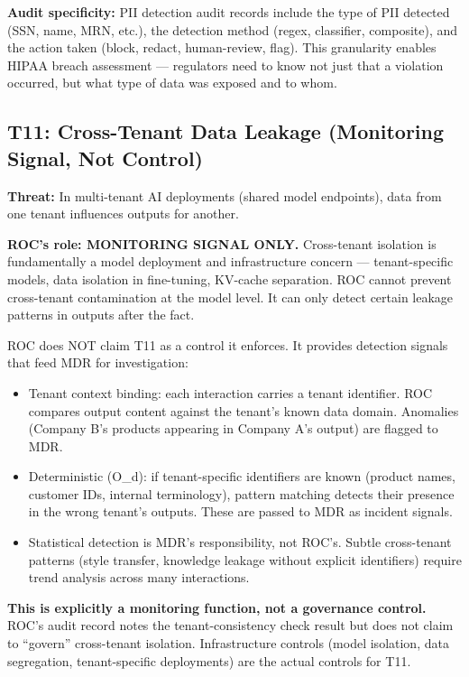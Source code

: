 \textbf{Audit specificity:} PII detection audit records include the type of PII detected (SSN, name, MRN, etc.), the detection method (regex, classifier, composite), and the action taken (block, redact, human-review, flag). This granularity enables HIPAA breach assessment --- regulators need to know not just that a violation occurred, but what type of data was exposed and to whom.

\subsection{T11: Cross-Tenant Data Leakage (Monitoring Signal, Not Control)}


\textbf{Threat:} In multi-tenant AI deployments (shared model endpoints), data from one tenant influences outputs for another.

\textbf{ROC's role: MONITORING SIGNAL ONLY.} Cross-tenant isolation is fundamentally a model deployment and infrastructure concern --- tenant-specific models, data isolation in fine-tuning, KV-cache separation. ROC cannot prevent cross-tenant contamination at the model level. It can only detect certain leakage patterns in outputs after the fact.

ROC does NOT claim T11 as a control it enforces. It provides detection signals that feed MDR for investigation:

\begin{itemize}
  \item Tenant context binding: each interaction carries a tenant identifier. ROC compares output content against the tenant's known data domain. Anomalies (Company B's products appearing in Company A's output) are flagged to MDR.
  \item Deterministic (O\_\allowbreak{}d): if tenant-specific identifiers are known (product names, customer IDs, internal terminology), pattern matching detects their presence in the wrong tenant's outputs. These are passed to MDR as incident signals.
  \item Statistical detection is MDR's responsibility, not ROC's. Subtle cross-tenant patterns (style transfer, knowledge leakage without explicit identifiers) require trend analysis across many interactions.
\end{itemize}


\textbf{This is explicitly a monitoring function, not a governance control.} ROC's audit record notes the tenant-consistency check result but does not claim to ``govern'' cross-tenant isolation. Infrastructure controls (model isolation, data segregation, tenant-specific deployments) are the actual controls for T11.




